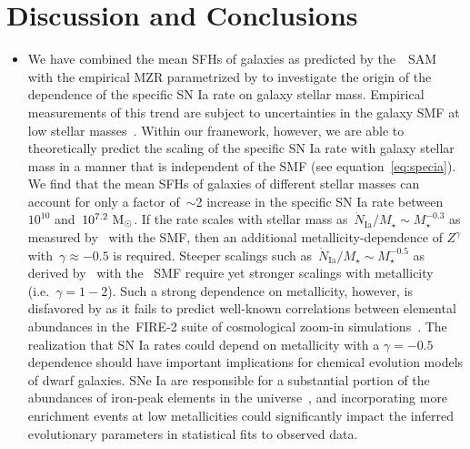 \documentclass[ms.tex]{subfiles}
\begin{document}
\section{Discussion and Conclusions}
\label{sec:conclusions}

\begin{itemize}

	\item We have combined the mean SFHs of galaxies as predicted by
	the~\um~SAM~\citep{Behroozi2019} with the empirical MZR parametrized by
	\citet{Zahid2014} to investigate the origin of the dependence of the
	specific SN Ia rate on galaxy stellar mass.
	Empirical measurements of this trend are subject to uncertainties in the
	galaxy SMF at low stellar masses~\citep{Gandhi2022}.
	Within our framework, however, we are able to theoretically predict the
	scaling of the specific SN Ia rate with galaxy stellar mass in a manner
	that is independent of the SMF (see equation~\ref{eq:specia}).
	We find that the mean SFHs of galaxies of different stellar masses can
	account for only a factor of~$\sim$2 increase in the specific SN Ia rate
	between~$10^{10}$ and~$10^{7.2}~\text{M}_\odot$.
	If the rate scales with stellar mass as~$\dot{N}_\text{Ia} / M_\star
	\sim M_\star^{-0.3}$ as measured by~\citet{Gandhi2022} with the
	\citet{Baldry2012} SMF, then an additional metallicity-dependence of
	$Z^\gamma$ with~$\gamma \approx -0.5$ is required.
	Steeper scalings such as~$\dot{N}_\text{Ia} / M_\star \sim M_\star^{-0.5}$
	as derived by~\citet{Brown2019} with the~\citet{Bell2003} SMF require yet
	stronger scalings with metallicity (i.e.~$\gamma = 1 - 2$).
	Such a strong dependence on metallicity, however, is disfavored by
	\citet{Gandhi2022} as it fails to predict well-known correlations between
	elemental abundances in the~\textsc{FIRE-2} suite of cosmological zoom-in
	simulations~\citep{Hopkins2018}.
	The realization that SN Ia rates could depend on metallicity with a
	$\gamma = -0.5$ dependence should have important implications for chemical
	evolution models of dwarf galaxies.
	SNe Ia are responsible for a substantial portion of the abundances of
	iron-peak elements in the universe~\citep[e.g.][]{Johnson2019}, and
	incorporating more enrichment events at low metallicities could
	significantly impact the inferred evolutionary parameters in statistical
	fits to observed data.


\end{itemize}
\end{document}
